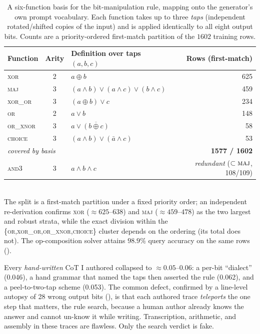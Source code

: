 \documentclass[11pt]{article}
\begin{document}
\begin{table}[htbp]
\centering
\caption{A six-function basis for the bit-manipulation rule, mapping onto the generator's own
prompt vocabulary. Each function takes up to three \emph{taps} (independent rotated/shifted
copies of the input) and is applied identically to all eight output bits. Counts are a
priority-ordered first-match partition of the $1602$ training rows.}
\label{tab:basis}
\small
\begin{tabular}{l c l r}
\toprule
Function & Arity & Definition over taps $(a,b,c)$ & Rows (first-match) \\
\midrule
\textsc{xor}      & 2 & $a\oplus b$ & 625 \\
\textsc{maj}      & 3 & $(a\wedge b)\vee(a\wedge c)\vee(b\wedge c)$ & 459 \\
\textsc{xor\_or}  & 3 & $(a\oplus b)\vee c$ & 234 \\
\textsc{or}       & 2 & $a\vee b$ & 148 \\
\textsc{or\_xnor} & 3 & $a\vee\overline{(b\oplus c)}$ & 58 \\
\textsc{choice}   & 3 & $(a\wedge b)\vee(\bar a\wedge c)$ & 53 \\
\midrule
\multicolumn{3}{l}{\emph{covered by basis}} & \textbf{1577 / 1602} \\
\textsc{and3}     & 3 & $a\wedge b\wedge c$ & \emph{redundant} ($\subset\textsc{maj}$, 108/109) \\
\bottomrule
\end{tabular}
\\[2pt]
{\footnotesize The split is a first-match partition under a fixed priority order; an
independent re-derivation confirms \textsc{xor} ($\approx\!625$--$638$) and \textsc{maj}
($\approx\!459$--$478$) as the two largest and robust strata, while the exact division within
the \{\textsc{or},\textsc{xor\_or},\textsc{or\_xnor},\textsc{choice}\} cluster depends on the
ordering (its total does not). The op-composition solver attains $98.9\%$ query accuracy on
the same rows ().}
\end{table}

Every \emph{hand-written} CoT I authored collapsed to $\approx\!0.05$--$0.06$: a per-bit
``dialect'' (0.046), a hand grammar that named the taps then asserted the rule (0.062), and
a peel-to-two-tap scheme (0.053). The common defect, confirmed by a line-level autopsy of 28
wrong output bits (), is that each authored trace \emph{teleports} the
one step that matters, the rule search, because a human author already knows the answer
and cannot un-know it while writing. Transcription, arithmetic, and assembly in these traces
are flawless. Only the search verdict is fake.
\end{document}
